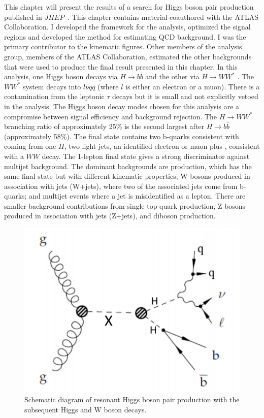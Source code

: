 This chapter will present the results of a search for Higgs boson pair production published in $JHEP$~\cite{Aaboud:2018zhh}. This chapter contains material coauthored with the ATLAS Collaboration. I developed the framework for the analysis, optimized the signal regions and developed the method for estimating QCD background. I was the primary contributor to the kinematic figures. Other members of the analysis group, members of the ATLAS Collaboration, estimated the other backgrounds that were used to produce the final result presented in this chapter. \newline
\indent In this analysis, one Higgs boson decays via ${H\rightarrow b\overline{b}}$ and the other via ${H\rightarrow WW^{*}}$ . The ${WW^{*}}$ system decays into ${l\nu qq}$ (where ${l}$ is either an electron or a muon). There is a contamination from the leptonic ${\tau}$ decays but it is small and not explicitly vetoed in the analysis. The Higgs boson decay modes chosen for this analysis are a compromise between signal efficiency and background rejection. The ${H\rightarrow WW^{*}}$ branching ratio of approximately 25\% is the second largest after ${H\rightarrow b\overline{b}}$ (approximately 58\%). The final state contains two b-quarks consistent with coming from one $H$, two light jets, an identified electron or muon plus \met{}, consistent with a $WW$ decay. The 1-lepton final state gives a strong discriminator against multijet background. The dominant backgrounds are \ttbar{} production, which has the same final state but with different kinematic properties; W bosons produced in association with jets (W+jets), where two of the associated jets come from b-quarks; and multijet events where a jet is misidentified as a lepton. There are smaller background contributions from single top-quark production, Z bosons produced in association with jets (Z+jets), and diboson production.\newline

\begin{figure}[h]
\begin{center}
\includegraphics[scale=0.65]{figures/res_prod}
\caption[Schematic diagram of ${HH\rightarrow b\bar{b}WW^{*}\rightarrow b\bar{b}l\nu qq}$]{Schematic diagram of resonant Higgs boson pair production with the subsequent Higgs and W boson
decays.}
\label{fig:res}
\end{center}
\end{figure}

